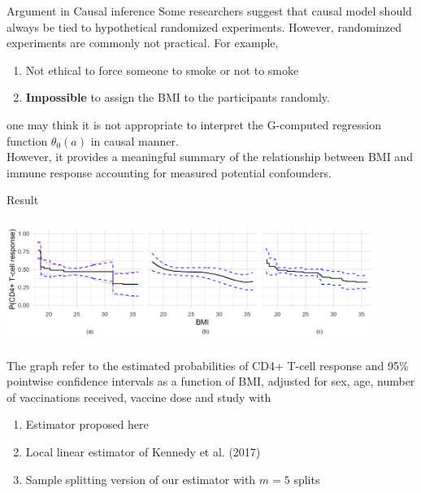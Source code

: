 \documentclass{beamer}
\begin{document}
\begin{frame}{Argument in Causal inference}
Some researchers suggest that causal model should always be tied to hypothetical randomized experiments. However, randominzed experiments are commonly not practical. For example,
\begin{enumerate}
	\item Not ethical to force someone to smoke or not to smoke
	\item \textbf{Impossible} to assign the BMI to the participants randomly.
\end{enumerate}
one may think it is not appropriate to interpret the G-computed regression function $\theta_0(a)$ in causal manner. \\
However, it provides a meaningful summary of the relationship between BMI and immune
response accounting for measured potential confounders.
\end{frame}

\begin{frame}{Result}
	\begin{center}
		\includegraphics[width=120mm,height=40mm]{Causal Isotonic Regression/Fig_Sec6}
	\end{center}
The graph refer to the estimated probabilities of CD4+ T-cell response and 95\% pointwise confidence intervals as a function of BMI, adjusted for sex, age, number of vaccinations received, vaccine dose and study with
\begin{enumerate}
	\item Estimator proposed here
	\item Local linear estimator of Kennedy et al. (2017)
	\item Sample splitting version of our estimator with $m=5$ splits
\end{enumerate}
\end{frame}
\end{document}

